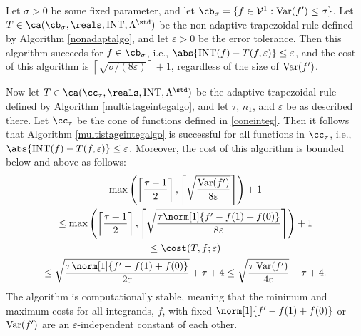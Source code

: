 \begin{theorem} \label{multistageintegthm}
Let $\sigma >0$ be some fixed parameter, and let $\cb_{\sigma}=\{f \in  \mathcal{V}^{1} : \Var(f')\leq \sigma\}$. Let $T \in \ca(\cb_{\sigma}, \reals, \INT, \Lambda^{\std})$ be the non-adaptive trapezoidal rule defined by Algorithm \ref{nonadaptalgo}, and let $\varepsilon>0$ be the error tolerance. Then this algorithm succeeds for $f \in \cb_{\sigma}$, i.e., $\abs{\INT(f) - T(f,\varepsilon)} \le \varepsilon$, and the cost of this algorithm is $\left \lceil \sqrt{\sigma/(8\varepsilon)}\right \rceil + 1$, regardless of the size of $\operatorname{Var}(f')$.

Now let $T \in \ca(\cc_{\tau}, \reals, \INT, \Lambda^{\std})$ be the adaptive trapezoidal rule defined by Algorithm \ref{multistageintegalgo}, and let $\tau$, $n_1$, and $\varepsilon$ be as described there. Let $\cc_\tau$ be the cone of functions defined in \eqref{coneinteg}.  Then it follows that Algorithm \ref{multistageintegalgo} is successful for all functions in $\cc_{\tau}$,  i.e.,  $\abs{\INT(f) - T(f,\varepsilon)} \le \varepsilon$.  Moreover, the cost of this algorithm is bounded below and above as follows:
\begin{multline}
\max \left(\left \lceil\frac{\tau+1}{2} \right \rceil, \left \lceil \sqrt{\frac{ \Var(f')}{8\varepsilon}} \right \rceil \right) +1 \\
\le \max \left(\left \lceil\frac{\tau+1}{2} \right \rceil, \left \lceil \sqrt{\frac{\tau \norm[1]{f'-f(1)+f(0)}}{8\varepsilon}} \right \rceil \right) +1 \\
\le
\cost(T,f;\varepsilon) \\
\le \sqrt{\frac{\tau \norm[1]{f'-f(1)+f(0)}}{2\varepsilon}} + \tau + 4
\le \sqrt{\frac{\tau \Var(f') }{4\varepsilon}} + \tau + 4.
\end{multline}
The algorithm is computationally stable, meaning that the minimum and maximum costs for all integrands, $f$, with fixed $\norm[1]{f'-f(1)+f(0)}$ or $\operatorname{Var}(f')$ are an $\varepsilon$-independent constant of each other.
\end{theorem}


